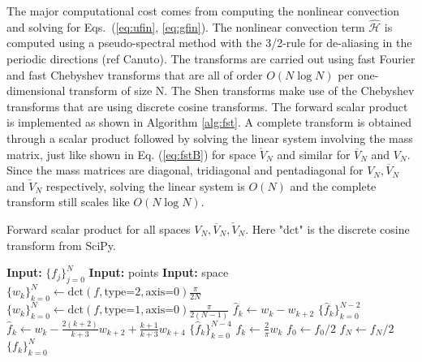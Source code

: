 \documentclass[11pt, oneside]{article}
\newcommand{\N}[1]{\check{#1}}
\newcommand{\D}[1]{\overline{#1}}
\begin{document}
The major computational cost comes from  computing the nonlinear convection 
and solving for Eqs.~(\ref{eq:ufin}, \ref{eq:gfin}). The nonlinear 
convection 
term $\bm{\hat{\mathcal{H}}}$ is computed using a pseudo-spectral method with 
the 3/2-rule for de-aliasing in the periodic directions (ref Canuto). The 
transforms are carried out using fast Fourier and fast Chebyshev transforms 
that are all of order $O(N\log N)$ per one-dimensional transform of size 
N. The Shen transforms make use of the Chebyshev transforms that are using 
discrete cosine transforms. The forward scalar product is implemented as shown 
in Algorithm \ref{alg:fst}. A complete transform is obtained through a scalar 
product followed by solving the linear system involving the mass 
matrix, just like shown in Eq. (\ref{eq:fstB}) for space $\N{V}_N$ and similar 
for $\D{V}_N$ and $V_N$. Since the mass matrices are diagonal, tridiagonal and 
pentadiagonal for $V_N, \D{V}_N$ and $\N{V}_N$ respectively, solving the linear 
system is $O(N)$ and the complete transform still scales like $O(N\log N)$. 
\begin{algorithm}
	\caption{Forward scalar product for all spaces $V_N, \D{V}_N, \N{V}_N$. 
	Here "dct" is the discrete cosine transform from SciPy.}
	\label{alg:fst}
	\begin{algorithmic}[1]
		\State \textbf{Input:} $\{f_j\}_{j=0}^{N}$
		\State \textbf{Input:} points
		\State \textbf{Input:} space
			\State $\{ w_k\}_{k=0}^{N} \gets \text{dct}(f, \text{type=2}, 
			\text{axis=0})\frac{\pi}{2 N}$
		    \State $\{ w_k\}_{k=0}^{N} \gets \text{dct}(f, \text{type=1}, 
		    \text{axis=0}) \frac{\pi}{2 (N-1)}$
	    \EndIf
	    \If{ space = $\D{V}_N$}
		        \State $\hat{f}_k \gets w_k - w_{k+2}$
	        \EndFor
			\State \Return $\{\hat{f}_k\}_{k=0}^{N-2}$	        
	    \ElsIf{ space = $\N{V}_N$}	                
       	        \State $\hat{f}_k \gets w_k - \frac{2(k+2)}{k+3} w_{k+2} + 
       	        \frac{k+1}{k+3}w_{k+4}$
   	        \EndFor
   	        \State \Return $\{\hat{f}_k\}_{k=0}^{N-4}$
   	    \Else{}
     	        \State $f_k \gets \frac{2}{\pi} w_k $
     	    \EndFor
     	    \State $f_0 \gets f_0 / 2$
	     	\State $f_N \gets f_N / 2$	     	
     	    \EndIf
			\State \Return $\{f_k\}_{k=0}^{N}$    
	    \EndIf
	\EndProcedure
\end{algorithmic}
\end{algorithm}
\end{document}
